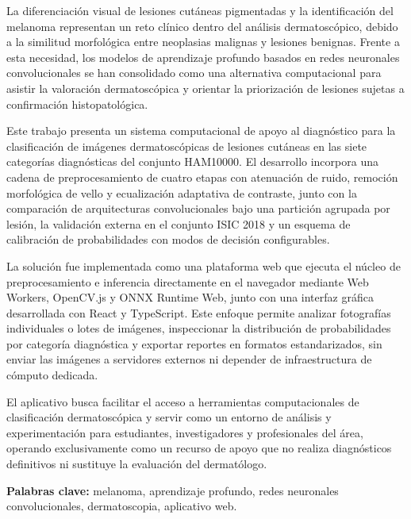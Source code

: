 La diferenciación visual de lesiones cutáneas pigmentadas y la identificación del melanoma representan un reto clínico dentro del análisis dermatoscópico, debido a la similitud morfológica entre neoplasias malignas y lesiones benignas. Frente a esta necesidad, los modelos de aprendizaje profundo basados en redes neuronales convolucionales se han consolidado como una alternativa computacional para asistir la valoración dermatoscópica y orientar la priorización de lesiones sujetas a confirmación histopatológica.

Este trabajo presenta un sistema computacional de apoyo al diagnóstico para la clasificación de imágenes dermatoscópicas de lesiones cutáneas en las siete categorías diagnósticas del conjunto HAM10000. El desarrollo incorpora una cadena de preprocesamiento de cuatro etapas con atenuación de ruido, remoción morfológica de vello y ecualización adaptativa de contraste, junto con la comparación de arquitecturas convolucionales bajo una partición agrupada por lesión, la validación externa en el conjunto ISIC 2018 y un esquema de calibración de probabilidades con modos de decisión configurables.

La solución fue implementada como una plataforma web que ejecuta el núcleo de preprocesamiento e inferencia directamente en el navegador mediante Web Workers, OpenCV.js y ONNX Runtime Web, junto con una interfaz gráfica desarrollada con React y TypeScript. Este enfoque permite analizar fotografías individuales o lotes de imágenes, inspeccionar la distribución de probabilidades por categoría diagnóstica y exportar reportes en formatos estandarizados, sin enviar las imágenes a servidores externos ni depender de infraestructura de cómputo dedicada.

El aplicativo busca facilitar el acceso a herramientas computacionales de clasificación dermatoscópica y servir como un entorno de análisis y experimentación para estudiantes, investigadores y profesionales del área, operando exclusivamente como un recurso de apoyo que no realiza diagnósticos definitivos ni sustituye la evaluación del dermatólogo.

\vspace{1em}
\noindent\textbf{Palabras clave:} melanoma, aprendizaje profundo, redes neuronales convolucionales, dermatoscopia, aplicativo web.
